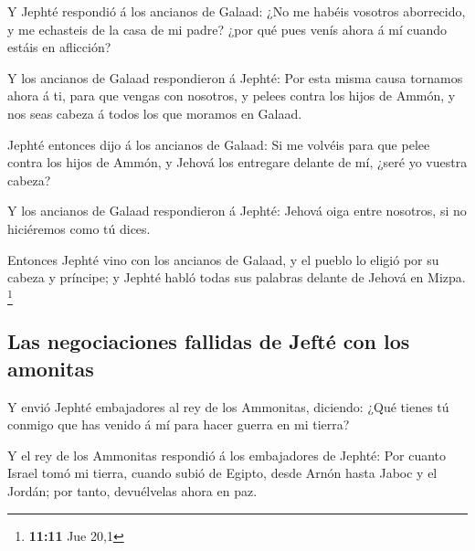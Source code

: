  Y Jephté respondió á los ancianos de Galaad: ¿No me
habéis vosotros aborrecido, y me echasteis de la casa de mi padre? ¿por
qué pues venís ahora á mí cuando estáis en aflicción?

 Y los ancianos de Galaad respondieron á Jephté: Por esta
misma causa tornamos ahora á ti, para que vengas con nosotros, y pelees
contra los hijos de Ammón, y nos seas cabeza á todos los que moramos en
Galaad.

 Jephté entonces dijo á los ancianos de Galaad: Si me
volvéis para que pelee contra los hijos de Ammón, y Jehová los entregare
delante de mí, ¿seré yo vuestra cabeza?

 Y los ancianos de Galaad respondieron á Jephté: Jehová
oiga entre nosotros, si no hiciéremos como tú dices.

 Entonces Jephté vino con los ancianos de Galaad, y el
pueblo lo eligió por su cabeza y príncipe; y Jephté habló todas sus
palabras delante de Jehová en Mizpa. \footnote{\textbf{11:11} Jue 20,1}

\hypertarget{las-negociaciones-fallidas-de-jeftuxe9-con-los-amonitas}{%
\subsection{Las negociaciones fallidas de Jefté con los
amonitas}\label{las-negociaciones-fallidas-de-jeftuxe9-con-los-amonitas}}

 Y envió Jephté embajadores al rey de los Ammonitas,
diciendo: ¿Qué tienes tú conmigo que has venido á mí para hacer guerra
en mi tierra?

 Y el rey de los Ammonitas respondió á los embajadores de
Jephté: Por cuanto Israel tomó mi tierra, cuando subió de Egipto, desde
Arnón hasta Jaboc y el Jordán; por tanto, devuélvelas ahora en paz.

